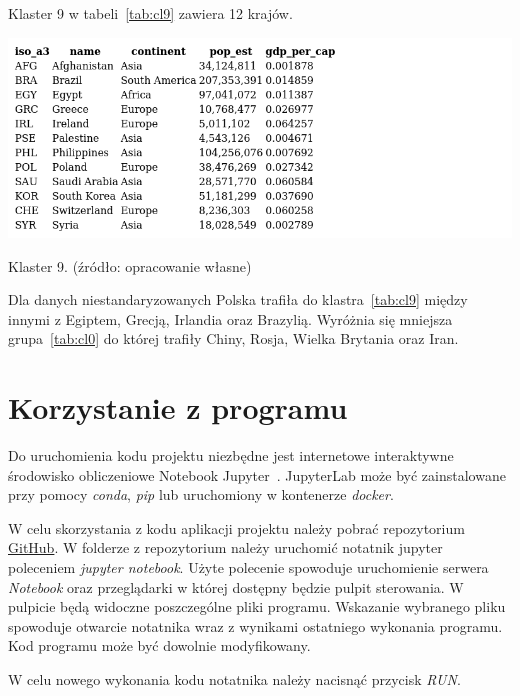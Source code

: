 \documentclass[11pt]{report}
\begin{document}
    Klaster 9 w tabeli~\ref{tab:cl9} zawiera 12 krajów.
    \begin{table}[!htp]
        \centering
        \includegraphics[width=\linewidth]{tables/CLUST/clust9kmeans.png}
        \caption{Klaster 9. (źródło: opracowanie własne)}
        \label{tab:cl9}
    \end{table}

    Dla danych niestandaryzowanych Polska trafiła do klastra~\ref{tab:cl9} między innymi z Egiptem, Grecją, Irlandia oraz Brazylią.
    Wyróżnia się mniejsza grupa~\ref{tab:cl0} do której trafiły Chiny, Rosja, Wielka Brytania oraz Iran.


    \chapter{Korzystanie z programu}\label{ch:korzystanie-z-programu}
    Do uruchomienia kodu projektu niezbędne jest internetowe interaktywne środowisko obliczeniowe Notebook Jupyter~\cite{jupyter}.
    JupyterLab może być zainstalowane przy pomocy \textit{conda}, \textit{pip} lub uruchomiony w kontenerze \textit{docker}.

    W celu skorzystania z kodu aplikacji projektu należy pobrać repozytorium \href{https://github.com/mijapa/GDELT}{GitHub}.
    W folderze z repozytorium należy uruchomić notatnik jupyter poleceniem \textit{jupyter notebook}.
    Użyte polecenie spowoduje uruchomienie serwera \textit{Notebook} oraz przeglądarki w której dostępny będzie pulpit sterowania.
    W pulpicie będą widoczne poszczególne pliki programu.
    Wskazanie wybranego pliku spowoduje otwarcie notatnika wraz z wynikami ostatniego wykonania programu.
    Kod programu może być dowolnie modyfikowany.

    W celu nowego wykonania kodu notatnika należy nacisnąć przycisk \textit{RUN}.



    \newpage
    \printbibliography[title={Bibliografia}]
\end{document}
